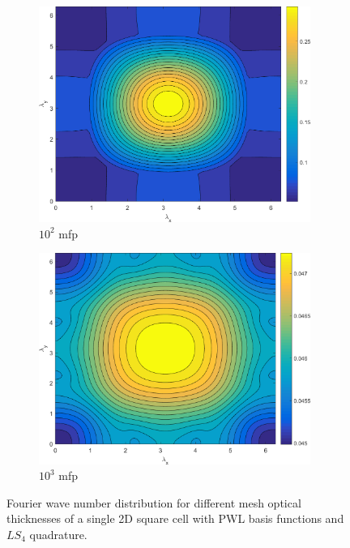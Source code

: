 \begin{figure}
{\begin{subfigure}[b]{0.485\textwidth}
		\centering
		\includegraphics[width=0.975\textwidth]{figures/sec_DSA/SI_MIP_C=4_UPWLD1_LS4_x=100_dydx=1_contour.png}
		\caption{$10^{2}$ mfp}
	\end{subfigure}
	\hfill
	\begin{subfigure}[b]{0.485\textwidth}
		\centering
		\includegraphics[width=0.975\textwidth]{figures/sec_DSA/SI_MIP_C=4_UPWLD1_LS4_x=1000_dydx=1_contour.png}
		\caption{$10^{3}$ mfp}
	\end{subfigure}
	}
\caption{Fourier wave number distribution for different mesh optical thicknesses of a single 2D square cell with PWL basis functions and $LS_{4}$ quadrature.}
\label{fig::2D_homo_dsa_wave_LS4}
\end{figure}

